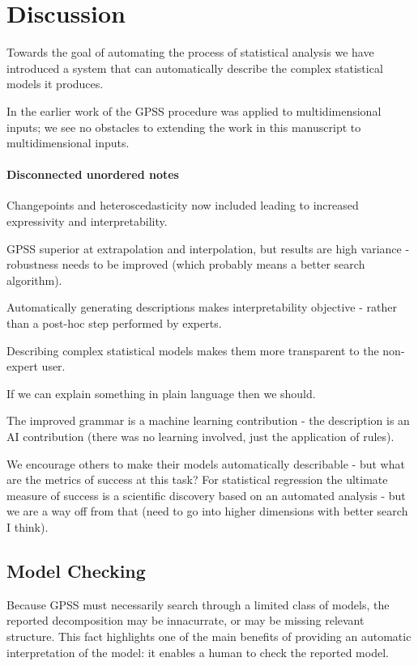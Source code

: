 \documentclass{article}
\begin{document}
\section{Discussion}


Towards the goal of automating the process of statistical analysis we have introduced a system that can automatically describe the complex statistical models it produces.

In the earlier work of \cite{DuvLloGroetal13} the GPSS procedure was applied to multidimensional inputs; we see no obstacles to extending the work in this manuscript to multidimensional inputs.

\paragraph{Disconnected unordered notes}

Changepoints and heteroscedasticity now included leading to increased expressivity and interpretability.

GPSS superior at extrapolation and interpolation, but results are high variance - robustness needs to be improved (which probably means a better search algorithm).

Automatically generating descriptions makes interpretability objective - rather than a post-hoc step performed by experts.

Describing complex statistical models makes them more transparent to the non-expert user.

If we can explain something in plain language then we should.

The improved grammar is a machine learning contribution - the description is an AI contribution (there was no learning involved, just the application of rules).

We encourage others to make their models automatically describable - but what are the metrics of success at this task?
For statistical regression the ultimate measure of success is a scientific discovery based on an automated analysis - but we are a way off from that (need to go into higher dimensions with better search I think).

\subsection{Model Checking}

Because GPSS must necessarily search through a limited class of models, the reported decomposition may be innacurrate, or may be missing relevant structure.  This fact highlights one of the main benefits of providing an automatic interpretation of the model: it enables a human to check the reported model.
\end{document}

